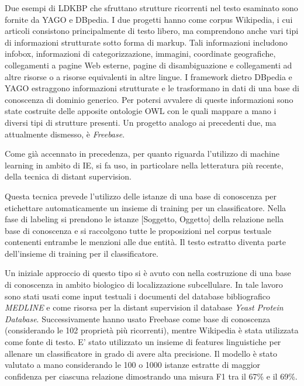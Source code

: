 Due esempi di LDKBP che sfruttano strutture ricorrenti nel testo esaminato sono fornite da YAGO\cite{Suchanek2007YagoAC} e DBpedia\cite{Lehmann2015DBpediaA}. I due progetti hanno come corpus Wikipedia, i cui articoli consistono principalmente di testo libero, ma comprendono anche vari tipi di informazioni strutturate sotto forma di markup. Tali informazioni includono infobox, informazioni di categorizzazione, immagini, coordinate geografiche, collegamenti a pagine Web esterne, pagine di disambiguazione e collegamenti ad altre risorse o a risorse equivalenti in altre lingue. I framework dietro DBpedia e YAGO estraggono informazioni strutturate e le trasformano in dati di una base di conoscenza di dominio generico. Per potersi avvalere di queste informazioni sono state costruite delle apposite ontologie OWL con le quali mappare a mano i diversi tipi di strutture presenti. Un progetto analogo ai precedenti due, ma attualmente dismesso, è \textit{Freebase}.

Come già accennato in precedenza, per quanto riguarda l'utilizzo di machine learning in ambito di IE, si fa uso, in particolare nella letteratura più recente, della tecnica di distant supervision. 

Questa tecnica prevede l'utilizzo delle istanze di una base di conoscenza per etichettare automaticamente un insieme di training per un classificatore. Nella fase di labeling si prendono le istanze [Soggetto, Oggetto] della relazione nella base di conoscenza e si raccolgono tutte le proposizioni nel corpus testuale contenenti entrambe le menzioni alle due entità. Il testo estratto diventa parte dell'insieme di training per il classificatore.

Un iniziale approccio di questo tipo si è avuto con \citet{Craven1999ConstructingBK} nella costruzione di una base di conoscenza in ambito biologico di localizzazione subcellulare. In tale lavoro sono stati usati come input testuali i documenti del database bibliografico \textit{MEDLINE} e come risorsa per la distant supervision il database \textit{Yeast Protein Database}. Successivamente \citet{Mintz2009DistantSF} hanno usato Freebase come base di conoscenza (considerando le 102 proprietà più ricorrenti), mentre Wikipedia è stata utilizzata come fonte di testo. E' stato utilizzato un insieme di features linguistiche per allenare un classificatore in grado di avere alta precisione. Il modello è stato valutato a mano considerando le 100 o 1000 istanze estratte di maggior confidenza per ciascuna relazione dimostrando una misura F1 tra il 67\% e il 69\%.

